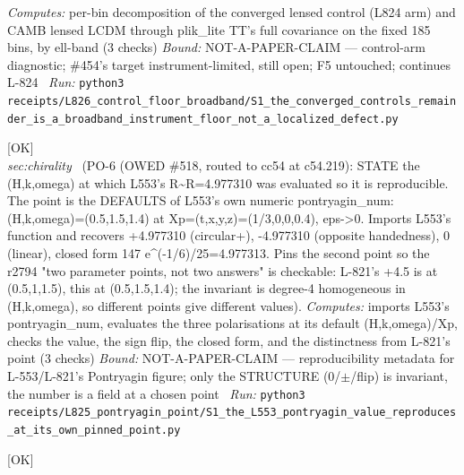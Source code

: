 \begin{description}
\emph{Computes:} per-bin decomposition of the converged lensed control (L824 arm) and CAMB lensed LCDM through plik\_lite TT's full covariance on the fixed 185 bins, by ell-band (3 checks)
 \emph{Bound:} NOT-A-PAPER-CLAIM --- control-arm diagnostic; \#454's target instrument-limited, still open; F5 untouched; continues L-824
\ \emph{Run:} \texttt{python3 receipts/L826\_control\_floor\_broadband/S1\_the\_converged\_controls\_remainder\_is\_a\_broadband\_instrument\_floor\_not\_a\_localized\_defect.py}
\item[\label{rcpt:S1_the_L553_pontryagin_value_reproduces_at_its_own_pinned_point}\texttt{S1\_the\_L553\_pontryagin\_value\_reproduces\_at\_its\_own\_pinned\_point}]\hfill\textsf{[OK]}\\
\textit{sec:chirality} \ (PO-6 (OWED \#518, routed to cc54 at c54.219): STATE the (H,k,omega) at which L553's R\textasciitilde{}R=4.977310 was evaluated so it is reproducible. The point is the DEFAULTS of L553's own numeric pontryagin\_num: (H,k,omega)=(0.5,1.5,1.4) at Xp=(t,x,y,z)=(1/3,0,0,0.4), eps->0. Imports L553's function and recovers +4.977310 (circular+), -4.977310 (opposite handedness), 0 (linear), closed form 147 e\textasciicircum{}(-1/6)/25=4.977313. Pins the second point so the r2794 "two parameter points, not two answers" is checkable: L-821's +4.5 is at (0.5,1,1.5), this at (0.5,1.5,1.4); the invariant is degree-4 homogeneous in (H,k,omega), so different points give different values). 
\emph{Computes:} imports L553's pontryagin\_num, evaluates the three polarisations at its default (H,k,omega)/Xp, checks the value, the sign flip, the closed form, and the distinctness from L-821's point (3 checks)
 \emph{Bound:} NOT-A-PAPER-CLAIM --- reproducibility metadata for L-553/L-821's Pontryagin figure; only the STRUCTURE (0/\ensuremath{\pm}/flip) is invariant, the number is a field at a chosen point
\ \emph{Run:} \texttt{python3 receipts/L825\_pontryagin\_point/S1\_the\_L553\_pontryagin\_value\_reproduces\_at\_its\_own\_pinned\_point.py}
\item[\label{rcpt:S1_the_dirac_barrier_has_no_bound_states_the_discrete_tower_count_is_zero_by_susy_positivity}\texttt{S1\_the\_dirac\_barrier\_has\_no\_bound\_states\_the\_discrete\_tower\_count\_is\_zero\_by\_susy\_positivity}]\hfill\textsf{[OK]}\\

\end{description}
